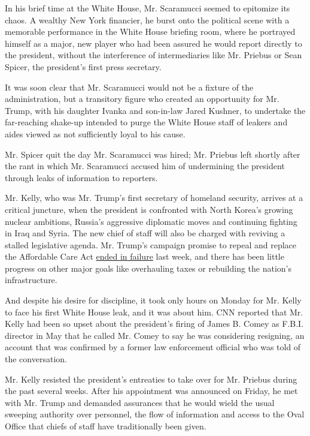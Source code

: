In his brief time at the White House, Mr. Scaramucci seemed to epitomize
its chaos. A wealthy New York financier, he burst onto the political
scene with a memorable performance in the White House briefing room,
where he portrayed himself as a major, new player who had been assured
he would report directly to the president, without the interference of
intermediaries like Mr. Priebus or Sean Spicer, the president's first
press secretary.

It was soon clear that Mr. Scaramucci would not be a fixture of the
administration, but a transitory figure who created an opportunity for
Mr. Trump, with his daughter Ivanka and son-in-law Jared Kushner, to
undertake the far-reaching shake-up intended to purge the White House
staff of leakers and aides viewed as not sufficiently loyal to his
cause.

Mr. Spicer quit the day Mr. Scaramucci was hired; Mr. Priebus left
shortly after the rant in which Mr. Scaramucci accused him of
undermining the president through leaks of information to reporters.

Mr. Kelly, who was Mr. Trump's first secretary of homeland security,
arrives at a critical juncture, when the president is confronted with
North Korea's growing nuclear ambitions, Russia's aggressive diplomatic
moves and continuing fighting in Iraq and Syria. The new chief of staff
will also be charged with reviving a stalled legislative agenda. Mr.
Trump's campaign promise to repeal and replace the Affordable Care Act
\href{https://www.nytimes.com/2017/07/27/us/politics/obamacare-partial-repeal-senate-republicans-revolt.html}{ended
in failure} last week, and there has been little progress on other major
goals like overhauling taxes or rebuilding the nation's infrastructure.

And despite his desire for discipline, it took only hours on Monday for
Mr. Kelly to face his first White House leak, and it was about him. CNN
reported that Mr. Kelly had been so upset about the president's firing
of James B. Comey as F.B.I. director in May that he called Mr. Comey to
say he was considering resigning, an account that was confirmed by a
former law enforcement official who was told of the conversation.

Mr. Kelly resisted the president's entreaties to take over for Mr.
Priebus during the past several weeks. After his appointment was
announced on Friday, he met with Mr. Trump and demanded assurances that
he would wield the usual sweeping authority over personnel, the flow of
information and access to the Oval Office that chiefs of staff have
traditionally been given.

